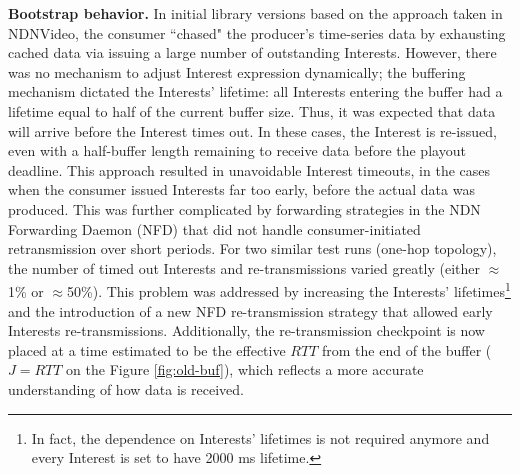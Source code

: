 \documentclass{icn/sig-alternate-2013} %
\begin{document}

%
%

\textbf{Bootstrap behavior.} In initial library versions based on the approach taken in NDNVideo, the consumer ``chased" the producer's time-series data by exhausting cached data via issuing a large number of outstanding Interests. However, there was no mechanism to adjust Interest expression dynamically; 
the buffering mechanism dictated the Interests' lifetime: all Interests entering the buffer had a lifetime equal to half of the current buffer size. Thus, it was expected that data will arrive before the Interest times out. In these cases, the Interest is re-issued, even with a half-buffer length remaining  to receive data before the playout deadline. This approach resulted in unavoidable Interest timeouts, in the cases when the consumer issued Interests far too early, before the actual data was produced.  This was further complicated by forwarding strategies in the NDN Forwarding Daemon (NFD) that did not handle consumer-initiated retransmission over short periods. 
For two similar test runs (one-hop topology), the number of timed out Interests and re-transmissions varied greatly (either $\approx$1\% or $\approx$50\%). %
This problem was addressed by increasing the Interests' lifetimes\footnote{In fact, the dependence on Interests' lifetimes is not required anymore and every Interest is set to have 2000 ms lifetime.} and the introduction of a new NFD re-transmission strategy that allowed early Interests re-transmissions. 
Additionally, the re-transmission checkpoint is now placed at a time estimated to be the effective $RTT$ from the end of the buffer ($J=RTT$ on the Figure \ref{fig:old-buf}), which reflects a more accurate understanding of how data is received.
\end{document}
